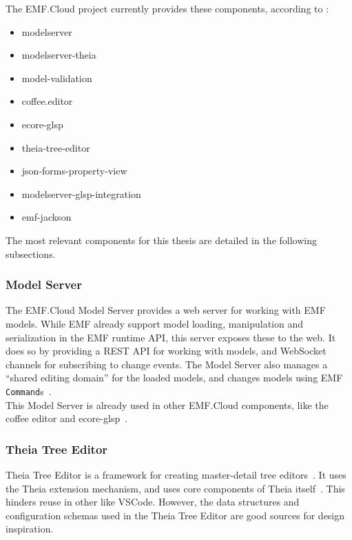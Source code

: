 The EMF.Cloud project currently provides these components, according to \cite{tobiasortmayrEclipseemfcloudEmfcloud2021}:

\begin{itemize}
  \item modelserver
  \item modelserver-theia
  \item model-validation
  \item coffee.editor
  \item ecore-glsp
  \item theia-tree-editor
  \item json-forms-property-view
  \item modelserver-glsp-integration
  \item emf-jackson
\end{itemize}

The most relevant components for this thesis are detailed in the following subsections.

\subsubsection{Model Server}
The EMF.Cloud Model Server provides a web server for working with \acrshort{EMF} models.
While \acrshort{EMF} already support model loading, manipulation and serialization in the \acrshort{EMF} runtime \acrshort{API}, this server exposes these to the web.
It does so by providing a \gls{REST} \acrshort{API} for working with models, and \gls{WebSocket} channels for subscribing to change events.
The Model Server also manages a ``shared editing domain'' for the loaded models, and changes models using \acrshort{EMF} \texttt{Command}s~\cite{foundationEMFCloud}.\\

This Model Server is already used in other EMF.Cloud components, like the coffee editor and ecore-glsp~\cite{eugenneufeldEclipseemfcloudCoffeeeditor2021,ninadoschekEclipseemfcloudEcoreglsp2021}.

\subsubsection{Theia Tree Editor}\label{par:theia-tree-editor}
Theia Tree Editor is a framework for creating master-detail tree editors~\cite{foundationEMFCloud}.
It uses the Theia extension mechanism, and uses core components of \gls{Theia} itself~\cite{rekstadModelingEnvironmentCloud2020}.
This hinders reuse in other  like \gls{VSCode}.
However, the data structures and configuration schemas used in the Theia Tree Editor are good sources for design inspiration.

